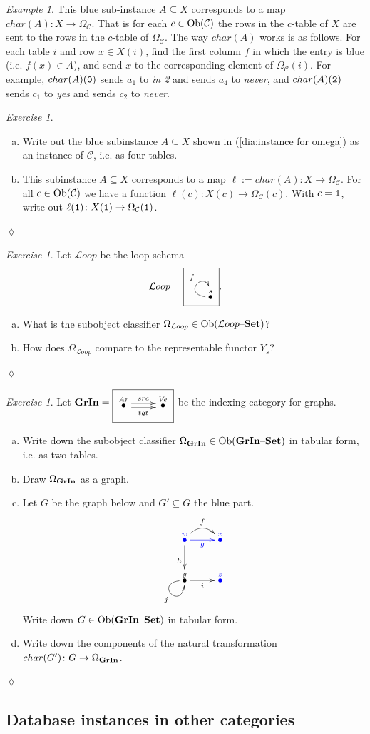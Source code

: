 \documentclass{book}
\makeatletter
\def\tn{\textnormal}
\def\mc{\mathcal}
\def\Ob{\tn{Ob}}
\def\to{\rightarrow}
\def\taking{\colon}
\def\ss{\subseteq}
\newcommand{\LMO}[1]{\stackrel{#1}{\bullet}}
\def\set{{\text \textendash}{\bf Set}}
\def\mcC{\mc{C}}
\def\mcL{\mc{L}}
\def\Loop{{\mcL oop}}
\def\LoopSchema{{\parbox{.5in}{\fbox{\xymatrix{\LMO{s}\ar@(l,u)[]^f}}}}}
\theoremstyle{remark}
\newtheorem{example}[subsubsection]{Example}
\newtheorem{exc}[subsubsection]{Exercise}
\newenvironment{exercise}{\begin{exc}}{\hspace*{\fill}$\lozenge$\end{exc}}
\theoremstyle{definition}
\def\GrIn{{\bf GrIn}}
\def\GrInSchema{\xymatrix{\LMO{Ar}\ar@<.5ex>[r]^{src}\ar@<-.5ex>[r]_{tgt}&\LMO{V\!e}}}
\def\sexc{\begin{enumerate}[a.)]\setlength{\itemsep}{.1cm}\setlength{\parskip}{.1cm}\item}
\def\next{\item}
\def\endsexc{\end{enumerate}}
\makeatother
\begin{document}
\begin{example}
This blue sub-instance $A\ss X$ corresponds to a map $char(A)\taking X\to\Omega_\mcC$. That is for each $c\in\Ob(\mcC)$ the rows in the $c$-table of $X$ are sent to the rows in the $c$-table of $\Omega_\mcC$. The way $char(A)$ works is as follows. For each table $i$ and row $x\in X(i)$, find the first column $f$ in which the entry is blue (i.e. $f(x)\in A$), and send $x$ to the corresponding element of $\Omega_\mcC(i)$. For example, $char(A)({\tt 0})$ sends $a_1$ to {\it in 2} and sends $a_4$ to {\it never}, and $char(A)({\tt 2})$ sends $c_1$ to {\it yes} and sends $c_2$ to {\it never}.

\end{example}

\begin{exercise}
\sexc Write out the blue subinstance $A\ss X$ shown in (\ref{dia:instance for omega}) as an instance of $\mcC$, i.e. as four tables. 
\next This subinstance $A\ss X$ corresponds to a map $\ell:=char(A)\taking X\to\Omega_\mcC$. For all $c\in\Ob(\mcC)$ we have a function $\ell(c)\taking X(c)\to\Omega_\mcC(c)$. With $c={\tt 1}$, write out $\ell({\tt 1})\taking X({\tt 1})\to\Omega_\mcC({\tt 1})$.
\endsexc
\end{exercise}

\begin{exercise}
Let $\Loop$ be the loop schema 
$$\Loop=\LoopSchema.$$ 
\sexc What is the subobject classifier $\Omega_\Loop\in\Ob(\Loop\set)$?
\next How does $\Omega_\Loop$ compare to the representable functor $Y_s$?
\endsexc
\end{exercise}

\begin{exercise}   
Let $\GrIn=\fbox{\GrInSchema}$ be the indexing category for graphs. 
\sexc Write down the subobject classifier $\Omega_\GrIn\in\Ob(\GrIn\set)$ in tabular form, i.e. as two tables.
\next Draw $\Omega_\GrIn$ as a graph.
\next Let $G$ be the graph below and $G'\ss G$ the blue part.
$$\xymatrix{
\LMO{\color{blue}{w}}\ar@/^1pc/[r]^f\ar@[blue][r]_{\color{blue}{g}}\ar[d]_h&\LMO{\color{blue}{x}}\\
\LMO{y}\ar@(l,d)[]_j\ar[r]_i&\LMO{\color{blue}{z}}
}
$$
Write down $G\in\Ob(\GrIn\set)$ in tabular form.
\next Write down the components of the natural transformation $char(G')\taking G\to\Omega_\GrIn$.
\endsexc
\end{exercise}


\subsection{Database instances in other categories}
\end{document}
